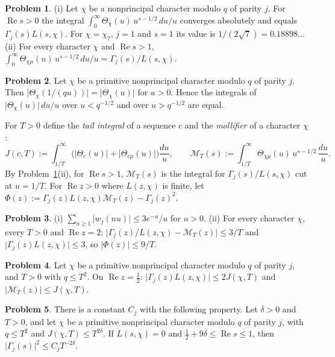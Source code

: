 \documentclass[reqno]{amsart}
\theoremstyle{definition}
\newtheorem{problem}{Problem}[section]
\theoremstyle{plain}
\theoremstyle{remark}
\renewcommand{\Re}{\operatorname{Re}}
\begin{document}
\begin{problem}\label{pr:theta-mellin}
(i) Let $\chi$ be a nonprincipal character modulo $q$ of parity $j$.  For $\Re s > 0$ the integral $\int_0^\infty \Theta_\chi(u)\, u^{s - 1/2}\, du/u$ converges absolutely and equals $\Gamma_j(s) L(s, \chi)$.  For $\chi = \chi_7$, $j = 1$ and $s = 1$ its value is $1/(2\sqrt 7) = 0.18898\ldots$
(ii) For every character $\chi$ and $\Re s > 1$, $\int_0^\infty \Theta_{\chi\mu}(u)\, u^{s - 1/2}\, du/u = \Gamma_j(s)/L(s, \chi)$.
\end{problem}

\begin{problem}\label{pr:theta-fe}
Let $\chi$ be a primitive nonprincipal character modulo $q$ of parity $j$.  Then $\lvert \Theta_\chi(1/(q u)) \rvert = \lvert \Theta_\chi(u) \rvert$ for $u > 0$.  Hence the integrals of $\lvert \Theta_\chi(u) \rvert\, du/u$ over $u < q^{-1/2}$ and over $u > q^{-1/2}$ are equal.
\end{problem}

For $T > 0$ define the \emph{tail integral} of a sequence $c$ and the \emph{mollifier} of a character $\chi$:
\[
  J(c, T) := \int_{1/T}^\infty \bigl( \lvert \Theta_c(u) \rvert + \lvert \Theta_{c\mu}(u) \rvert \bigr) \frac{du}{u},
  \qquad
  \mathcal{M}_T(s) := \int_{1/T}^\infty \Theta_{\chi\mu}(u)\, u^{s - 1/2} \, \frac{du}{u} .
\]
By Problem~\ref{pr:theta-mellin}(ii), for $\Re s > 1$, $\mathcal{M}_T(s)$ is the integral for $\Gamma_j(s)/L(s, \chi)$ cut at $u = 1/T$.  For $\Re z > 0$ where $L(z, \chi)$ is finite, let $\Phi(z) := \Gamma_j(z) L(z, \chi) \mathcal{M}_T(z) - \Gamma_j(z)^2$.

\begin{problem}\label{pr:mollifier}
(i) $\sum_{n \ge 1} \lvert w_j(n u) \rvert \le 3 e^{-u}/u$ for $u > 0$.
(ii) For every character $\chi$, every $T > 0$ and $\Re z = 2$: $\lvert \Gamma_j(z)/L(z, \chi) - \mathcal{M}_T(z) \rvert \le 3/T$ and $\lvert \Gamma_j(z) L(z, \chi) \rvert \le 3$, so $\lvert \Phi(z) \rvert \le 9/T$.
\end{problem}

\begin{problem}\label{pr:half-line}
Let $\chi$ be a primitive nonprincipal character modulo $q$ of parity $j$, and $T > 0$ with $q \le T^2$.  On $\Re z = \frac12$: $\lvert \Gamma_j(z) L(z, \chi) \rvert \le 2 J(\chi, T)$ and $\lvert \mathcal{M}_T(z) \rvert \le J(\chi, T)$.
\end{problem}

\begin{problem}\label{pr:three-lines}
There is a constant $C_j$ with the following property.  Let $\delta > 0$ and $T > 0$, and let $\chi$ be a primitive nonprincipal character modulo $q$ of parity $j$, with $q \le T^2$ and $J(\chi, T) \le T^{2\delta}$.  If $L(s, \chi) = 0$ and $\frac12 + 9\delta \le \Re s \le 1$, then $\lvert \Gamma_j(s) \rvert^2 \le C_j T^{-2\delta}$.
\end{problem}
\end{document}
